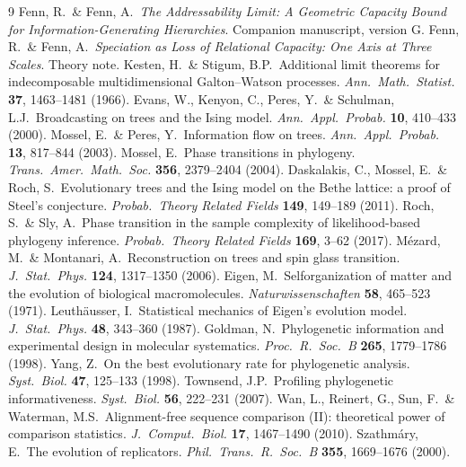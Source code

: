 \documentclass[11pt]{article}
\begin{document}
\begin{thebibliography}{9}\small
{} Fenn, R.\ \& Fenn, A.\ \emph{The Addressability Limit: A Geometric Capacity Bound for Information-Generating Hierarchies}. Companion manuscript, version G.
 Fenn, R.\ \& Fenn, A.\ \emph{Speciation as Loss of Relational Capacity: One Axis at Three Scales}. Theory note.
 Kesten, H.\ \& Stigum, B.P.\ Additional limit theorems for indecomposable multidimensional Galton--Watson processes. \emph{Ann.\ Math.\ Statist.} \textbf{37}, 1463--1481 (1966).
 Evans, W., Kenyon, C., Peres, Y.\ \& Schulman, L.J.\ Broadcasting on trees and the Ising model. \emph{Ann.\ Appl.\ Probab.} \textbf{10}, 410--433 (2000).
 Mossel, E.\ \& Peres, Y.\ Information flow on trees. \emph{Ann.\ Appl.\ Probab.} \textbf{13}, 817--844 (2003).
 Mossel, E.\ Phase transitions in phylogeny. \emph{Trans.\ Amer.\ Math.\ Soc.} \textbf{356}, 2379--2404 (2004).
 Daskalakis, C., Mossel, E.\ \& Roch, S.\ Evolutionary trees and the Ising model on the Bethe lattice: a proof of Steel's conjecture. \emph{Probab.\ Theory Related Fields} \textbf{149}, 149--189 (2011).
 Roch, S.\ \& Sly, A.\ Phase transition in the sample complexity of likelihood-based phylogeny inference. \emph{Probab.\ Theory Related Fields} \textbf{169}, 3--62 (2017).
 M\'ezard, M.\ \& Montanari, A.\ Reconstruction on trees and spin glass transition. \emph{J.\ Stat.\ Phys.} \textbf{124}, 1317--1350 (2006).
 Eigen, M.\ Selforganization of matter and the evolution of biological macromolecules. \emph{Naturwissenschaften} \textbf{58}, 465--523 (1971).
 Leuth\"ausser, I.\ Statistical mechanics of Eigen's evolution model. \emph{J.\ Stat.\ Phys.} \textbf{48}, 343--360 (1987).
 Goldman, N.\ Phylogenetic information and experimental design in molecular systematics. \emph{Proc.\ R.\ Soc.\ B} \textbf{265}, 1779--1786 (1998).
 Yang, Z.\ On the best evolutionary rate for phylogenetic analysis. \emph{Syst.\ Biol.} \textbf{47}, 125--133 (1998).
 Townsend, J.P.\ Profiling phylogenetic informativeness. \emph{Syst.\ Biol.} \textbf{56}, 222--231 (2007).
 Wan, L., Reinert, G., Sun, F.\ \& Waterman, M.S.\ Alignment-free sequence comparison (II): theoretical power of comparison statistics. \emph{J.\ Comput.\ Biol.} \textbf{17}, 1467--1490 (2010).
 Szathmáry, E.\ The evolution of replicators. \emph{Phil.\ Trans.\ R.\ Soc.\ B} \textbf{355}, 1669--1676 (2000).

\end{thebibliography}
\end{document}

